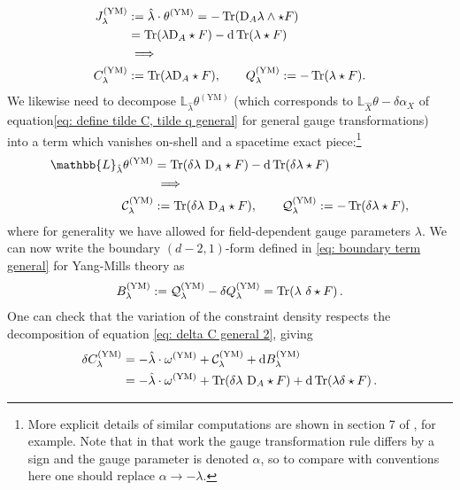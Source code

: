 \documentclass[]{jkpaper}
\theoremstyle{plain}
\theoremstyle{definition}
\newcommand{\fins}{\cdot}
\newcommand{\sd}{\mathrm {d}}
\newcommand{\fd}{\delta}
\newcommand{\fL}{\mathbb{L}}
\newcommand{\DD}[1]{\text{D}_A#1}
\begin{document}
\begin{equation}\begin{split}
    J^{(\text{YM})}_{\lambda}
    &:=\hat{\lambda}\fins\theta^{(\text{YM})} 
    = -\Tr(\DD\lambda\wedge\star F)\\
    &=\Tr(\lambda\DD\star F)-\sd\Tr(\lambda\star F)\\
    &\implies\\
    C^{(\text{YM})}_\lambda&:=\Tr(\lambda\DD\star F), \qquad Q^{(\text{YM})}_\lambda:=-\Tr(\lambda\star F).
\end{split}\end{equation}
We likewise need to decompose $\fL_{\hat{\lambda}}\theta^{(\text{YM})}$ (which corresponds to $\fL_{\hat{X}}\theta-\fd\alpha_X$ of equation\eqref{eq: define tilde C, tilde q general} for general gauge transformations) into a term which vanishes on-shell and a spacetime exact piece:\footnote{More explicit details of similar computations are shown in section 7 of \cite{Carrozza:2021gju}, for example.  Note that in that work the gauge transformation rule differs by a sign and the gauge parameter is denoted $\alpha$, so to compare with conventions here one should replace $\alpha\rightarrow-\lambda$.} 
\begin{equation}\begin{split}
    \fL_{\hat{\lambda}}\theta^{(\text{YM})}
    &=\Tr(\delta\lambda ~\DD\star F)-\sd\Tr(\delta\lambda\star F)\\
    &\implies\\
    \mathcal{C}^{(\text{YM})}_{\lambda}
    &:=\Tr(\delta\lambda~\DD\star F),\qquad
    \mathcal{Q}^{(\text{YM})}_{\lambda}
    :=-\Tr(\delta\lambda\star F),
\end{split}\end{equation}
where for generality we have allowed for field-dependent gauge parameters $\lambda$. We can now write the boundary $(d-2,1)$-form defined in \eqref{eq: boundary term general} for Yang-Mills theory as
\begin{equation}\label{eq: boundary piece, YM}
    B^{(\text{YM})}_{\lambda}:=\mathcal{Q}^{(\text{YM})}_{\lambda}-\fd Q^{(\text{YM})}_{\lambda}
    =\Tr(\lambda~\fd\star F)\,.
\end{equation}
One can check that the variation of the constraint density respects the decomposition of equation \eqref{eq: delta C general 2}, giving
\begin{equation}\begin{split}\label{eq: delta C YM}
    \delta C^{(\text{YM})}_{\lambda} 
    &=-\hat{\lambda}\cdot \omega^{(\text{YM})} + \mathcal{C}^{(\text{YM})}_{\lambda}+\sd B^{(\text{YM})}_\lambda\\
    &=-\hat{\lambda}\cdot \omega^{(\text{YM})} + \Tr(\delta\lambda ~\DD\star F)+\sd\Tr(\lambda \fd \star F)\,.
\end{split}\end{equation}
\end{document}
